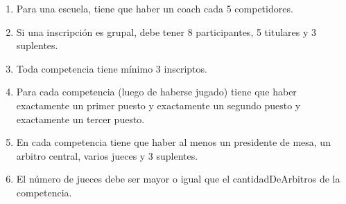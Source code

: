 \begin{enumerate}
  \item Para una escuela, tiene que haber un coach cada 5 competidores.
  \item Si una inscripción es grupal, debe tener 8 participantes, 5 titulares y 3 suplentes.
  \item Toda competencia tiene mínimo 3 inscriptos.
  \item Para cada competencia (luego de haberse jugado) tiene que haber exactamente un primer puesto y exactamente un segundo puesto y exactamente un tercer puesto.
  \item En cada competencia tiene que haber al menos un presidente de mesa, un arbitro central, varios jueces y 3 suplentes.
  \item El número de jueces debe ser mayor o igual que el cantidadDeArbitros de la competencia.



\end{enumerate}
